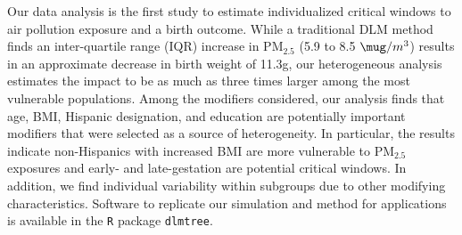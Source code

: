 \documentclass[12pt]{article}
\begin{document}
Our data analysis is the first study to estimate individualized critical windows to air pollution exposure and a birth outcome. While a traditional DLM method finds an inter-quartile range (IQR) increase in PM$_{2.5}$ (5.9 to 8.5 $\mug/m^3$) results in an approximate decrease in birth weight of 11.3g, our heterogeneous analysis estimates the impact to be as much as three times larger among the most vulnerable populations. Among the modifiers considered, our analysis finds that age, BMI, Hispanic designation, and education are potentially important modifiers that were selected as a source of heterogeneity. In particular, the results indicate non-Hispanics with increased BMI are more vulnerable to PM$_{2.5}$ exposures and early- and late-gestation are potential critical windows. In addition, we find individual variability within subgroups due to other modifying characteristics. Software to replicate our simulation and method for applications is available in the \texttt{R} package \texttt{dlmtree}.



\end{document}
